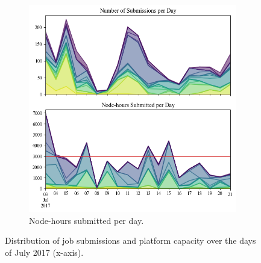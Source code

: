 \documentclass[a4paper,fleqn]{cas-dc}
\begin{document}
\begin{figure}[tbp]
\begin{subfigure}[t]{0.8\linewidth}
    \centering
    \includegraphics[clip,width=\linewidth,trim={0.1cm 1.1cm 0.1cm 7.5cm}]{figures/submissions.png}
    \caption{Node-hours submitted per day.}
    \label{fig:wl_distrib_sub_bottom}
\end{subfigure}

\caption{Distribution of job submissions and platform capacity over the days of July 2017 (x-axis).}
\label{fig:wl_distrib_sub}
\end{figure}
\end{document}
